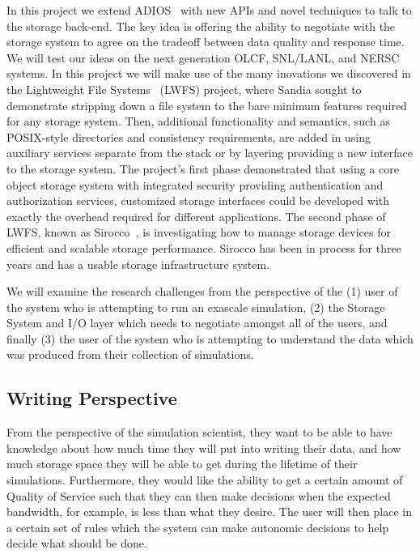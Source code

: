 In this project we extend ADIOS~\cite{adios} with new APIs and novel techniques
to talk to the storage back-end. The key idea is offering the ability to
negotiate with the storage system to agree on the tradeoff between data quality
and response time.  We will test our ideas on the next generation OLCF,
SNL/LANL, and  NERSC systems.
%
In this project we will make use of the many inovations we discovered in 
the Lightweight File Systems~\cite{lwfs} (LWFS) project, where Sandia sought to
demonstrate stripping down a file system to the bare minimum features required
for any storage system. Then, additional functionality and semantics, such as
POSIX-style directories and consistency requirements, are added in using
auxiliary services separate from the stack or by layering providing a new
interface to the storage system. The project's first phase demonstrated that
using a core object storage system with integrated security providing
authentication and authorization services, customized storage interfaces could
be developed with exactly the overhead required for different applications. The
second phase of LWFS, known as Sirocco~\cite{sirocco}, is investigating how to
manage storage devices for efficient and scalable storage performance.  Sirocco
has been in process for three years and has a usable storage infrastructure
system.


We will examine the research challenges from the perspective of the
%
(1) user of the system who is attempting to run an exascale simulation,
%
(2) the Storage System and I/O layer which needs to negotiate amongst all of
the users, and finally
%
(3) the user of the system who is attempting to understand the data which
was produced from their collection of simulations.

\subsection{Writing Perspective}
\label{subsec:sim-perspective}
From the perspective of the simulation scientist, they want to be able to
have knowledge about how much time they will put into writing their data,
and how much storage space they will be able to get during the lifetime of
their simulations. Furthermore, they would like the ability to get a certain
amount of Quality of Service such that they can then make decisions when the
expected bandwidth, for example, is less than what they desire. The user will
then place in a certain set of rules which the system can make autonomic
decisions to help decide what should be done.
%

